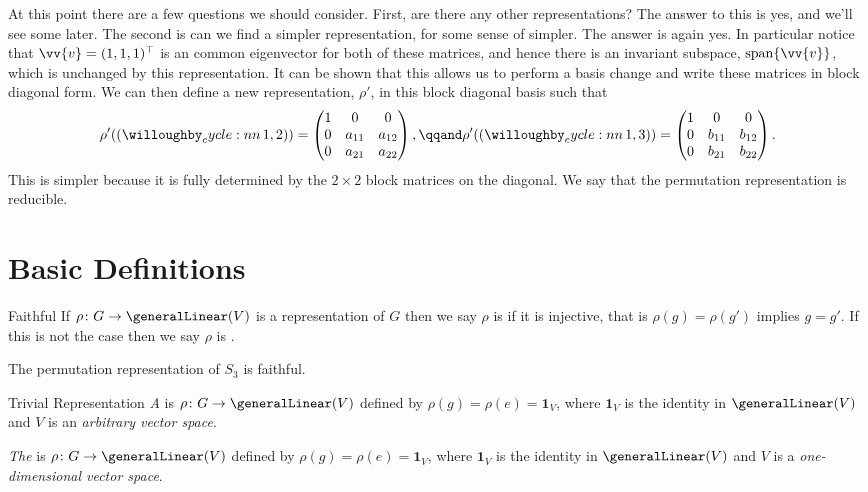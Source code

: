 \documentclass[fleqn]{NotesClass}
\newcommand*{\trans}{\top}
\newcommand*{\ident}{\mathbf{1}}
\DeclareMathOperator{\spn}{span}
\begin{document}
    At this point there are a few questions we should consider.
    First, are there any other representations?
    The answer to this is yes, and we'll see some later.
    The second is can we find a simpler representation, for some sense of simpler.
    The answer is again yes.
    In particular notice that \(\vv{v} = (1, 1, 1)^{\trans}\) is an common eigenvector for both of these matrices, and hence there is an invariant subspace, \(\spn\{\vv{v}\}\), which is unchanged by this representation.
    It can be shown that this allows us to perform a basis change and write these matrices in block diagonal form.
    We can then define a new representation, \(\rho'\), in this block diagonal basis such that
    \begin{equation}
        \rho'(\cycle{1, 2}) = 
        \begin{pmatrix}
            1 & 0 & 0\\
            0 & a_{11} & a_{12}\\
            0 & a_{21} & a_{22}
        \end{pmatrix}
        ,\qqand \rho'(\cycle{1, 3}) = 
        \begin{pmatrix}
            1 & 0 & 0\\
            0 & b_{11} & b_{12}\\
            0 & b_{21} & b_{22}
        \end{pmatrix}
        .
    \end{equation}
    This is simpler because it is fully determined by the \(2\times 2\) block matrices on the diagonal.
    We say that the permutation representation is reducible.
    
    \section{Basic Definitions}
    \begin{dfn}{Faithful}{}
        If \(\rho \colon G \to \generalLinear(V)\) is a representation of \(G\) then we say \(\rho\) is  if it is injective, that is \(\rho(g) = \rho(g')\) implies \(g = g'\).
        If this is not the case then we say \(\rho\) is .
    \end{dfn}
    
    The permutation representation of \(S_3\) is faithful.
    
    \begin{dfn}{Trivial Representation}{}
        \emph{A}  is \(\rho\colon G \to \generalLinear(V)\) defined by \(\rho(g) = \rho(e) = \ident_V\), where \(\ident_V\) is the identity in \(\generalLinear(V)\) and \(V\) is an \emph{arbitrary vector space}.
        
        \emph{The}  is \(\rho\colon G \to \generalLinear(V)\) defined by \(\rho(g) = \rho(e) = \ident_V\), where \(\ident_V\) is the identity in \(\generalLinear(V)\) and \(V\) is a \emph{one-dimensional vector space}.
    \end{dfn}
    
\end{document}
